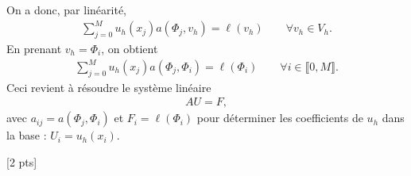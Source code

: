 \documentclass[12pt]{article}
\begin{document}
\begin{cor}
\begin{enumerate}
    On a donc, par lin\'earit\'e,
    \begin{align*}
      \sum_{j=0}^{M} u_h(x_j) a(\Phi_j , v_h) = \ell(v_h) \qquad \forall v_h \in V_{h} .
    \end{align*}
    En prenant $v_h = \Phi_i$, on obtient
    \begin{align*}
      \sum_{j=0}^{M} u_h(x_j) a(\Phi_j , \Phi_i) = \ell(\Phi_i) \qquad \forall i \in \llbracket 0 , M \rrbracket .
    \end{align*}
    Ceci revient \`a r\'esoudre le syst\`eme lin\'eaire
    \begin{align*}
      A U = F ,
    \end{align*}
    avec $a_{ij} = a(\Phi_j , \Phi_i)$
    et $F_i = \ell(\Phi_i)$ pour d\'eterminer les coefficients de $u_h$ dans la base :
    $U_i = u_h(x_i)$.

    [2 pts]


  \end{enumerate}
  
\end{cor}
\end{document}
